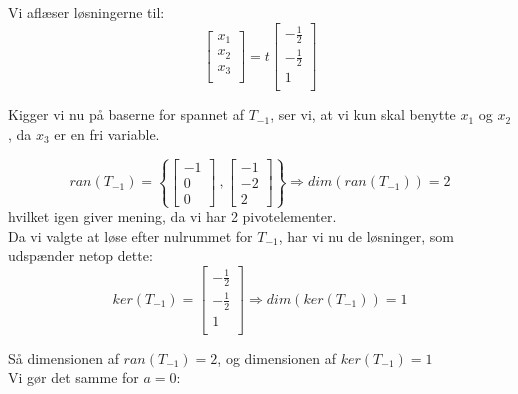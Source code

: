 \documentclass[a4paper,12pt]{article}
\begin{document}
Vi aflæser løsningerne til:\\
\[
\left[\begin{array}{ccc}
    x_1\\
    x_2\\
    x_3\\
\end{array}\right]
=
t
\left[\begin{array}{ccc}
    -\frac{1}{2}\\
    -\frac{1}{2}\\
    1\\
\end{array}\right]
\]

Kigger vi nu på baserne for spannet af $T_{-1}$, ser vi, at vi kun skal benytte $x_1$ og $x_2$, da $x_3$ er en fri variable. 

\[
ran(T_{-1}) = \left\{ 
\left[\begin{array}{ccc|c}
    -1 \\
    0   \\
    0  
\end{array}\right]\
,
\left[\begin{array}{ccc|c}
    -1 \\
    -2   \\
    2  
\end{array}\right]
\right\}
\Rightarrow
dim(ran(T_{-1})) = 2
\]
hvilket igen giver mening, da vi har 2 pivotelementer.\\

Da vi valgte at løse efter nulrummet for $T_{-1}$, har vi nu de løsninger, som udspænder netop dette:\\

\[
ker(T_{-1}) = 
\left[\begin{array}{ccc}
    -\frac{1}{2}\\
    -\frac{1}{2}\\
    1\\
\end{array}\right]
\Rightarrow
dim(ker(T_{-1})) = 1
\]

Så dimensionen af $ran(T_{-1}) = 2$, og dimensionen af $ker(T_{-1}) = 1$\\

Vi gør det samme for $a= 0$:\\
\end{document}

